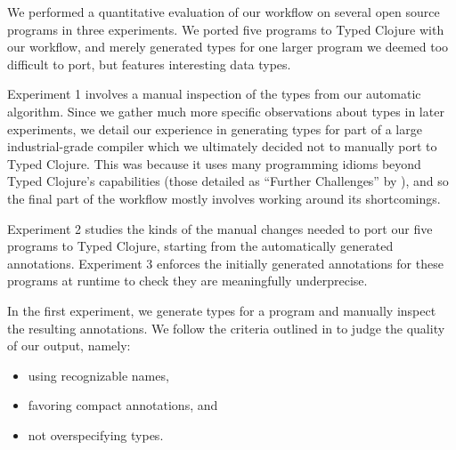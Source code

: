 \label{infer:chap:evaluation}

We performed a quantitative evaluation of our workflow on several open source programs
in three experiments.
We ported five programs to Typed Clojure with our workflow,
and merely generated types for one larger program we deemed too difficult to port,
but features interesting data types.

Experiment 1 involves a manual inspection of the types from our automatic algorithm.
Since we gather much more specific observations about types in later experiments, we detail
our experience in generating types for part of a large industrial-grade compiler which
we ultimately decided not to manually port to Typed Clojure.
This was because it uses many programming idioms beyond Typed Clojure's capabilities
(those detailed as ``Further Challenges'' by ),
and so the final part of the workflow mostly involves working around its shortcomings.

Experiment 2 studies the kinds of the manual changes needed to port our five programs
to Typed Clojure, starting from the automatically generated annotations.
Experiment 3 enforces the initially generated annotations for these programs at runtime
to check they are meaningfully underprecise.


\label{infer:sec:experiment1}



In the first experiment, we generate types for
a program and manually inspect the resulting
annotations.
We follow the criteria 
outlined in 
to judge the quality of our output, namely:
\begin{itemize}
  \item using recognizable names,
  \item favoring compact annotations, and
  \item not overspecifying types.
\end{itemize}


